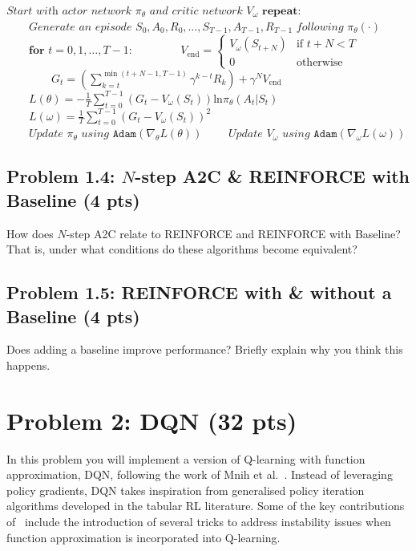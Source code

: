 \documentclass[12pt]{article}
\begin{document}
\begin{algorithm}[H]
\caption{$N$-step Advantage Actor-Critic\label{alg:a2c}}
\begin{algorithmic}[1]
\State $\textit{Start with actor network } \pi_\theta \textit{ and critic network } V_{\omega}$
\State $\textbf{repeat:}$
\State $\qquad\textit{Generate an episode } S_0, A_0, R_0, \ldots, S_{T-1}, A_{T-1}, R_{T-1} \textit{ following } \pi_\theta(\cdot)$
\State $\qquad\textbf{for } t =0, 1, \dots , T-1 $: \label{line:a2c:1}
\State $\qquad\qquad V_{\text{end}} = 
\begin{cases} 
V_{\omega}(S_{t+N}) & \text{if } t + N < T
\\
0 & \text{otherwise}
\end{cases}$ \label{line:a2c:2}
\State $\qquad\qquad G_t = \left(\sum_{k=t}^{\min(t + N - 1, T-1)} \gamma^{k-t} R_{k}\right) + \gamma^N V_{\text{end}} $ \label{line:a2c:3}
\State $\qquad L(\theta) = -\frac{1}{T} \sum_{t=0}^{T-1} (G_t - V_{\omega}(S_t)) \text{ln} \pi_\theta(A_t | S_t)$
\State $\qquad L(\omega) = \frac{1}{T} \sum_{t=0}^{T-1} (G_t - V_{\omega}(S_t))^2 $
\State $\qquad\textit{Update $\pi_\theta$ using } \texttt{Adam}\left(\nabla_\theta L(\theta)\right)$
\State $\qquad\textit{Update $V_\omega$ using } \texttt{Adam}\left(\nabla_\omega L(\omega)\right)$
\EndProcedure
\end{algorithmic}
\end{algorithm}




\subsection*{Problem 1.4: $N$-step A2C \& REINFORCE with Baseline (4 pts)}
How does $N$-step A2C relate to REINFORCE and REINFORCE with Baseline? That is, under what conditions do these algorithms become equivalent?

\subsection*{Problem 1.5: REINFORCE with \& without a Baseline (4 pts)}
Does adding a baseline improve performance? Briefly explain why you think this happens. 

\iffalse
\newpage
\section*{Problem 2: DQN (32 pts)}
In this problem you will implement a version of Q-learning with function approximation, DQN, following the work of Mnih et al.~\cite{mnih2015human}. Instead of leveraging policy gradients, DQN takes inspiration from generalised policy iteration algorithms developed in the tabular RL literature. Some of the key contributions of~\cite{mnih2015human} include the introduction of several tricks to address instability issues when function approximation is incorporated into Q-learning. 
\end{document}
